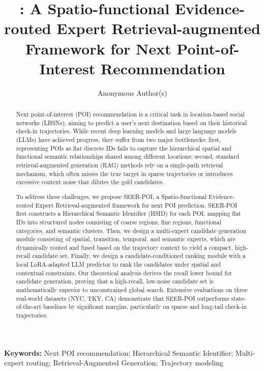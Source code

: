 \documentclass[10pt,twocolumn]{article}
\title{\vspace{-1.0em}\bfseries \method: A Spatio-functional Evidence-routed Expert Retrieval-augmented Framework for Next Point-of-Interest Recommendation}
\author{Anonymous Author(s)}
\date{}
\newcommand{\method}{SEER-POI}
\newcommand{\hsid}{HSID}
\begin{document}
\maketitle
\vspace{-1.35em}

\begin{abstract}
Next point-of-interest (POI) recommendation is a critical task in location-based social networks (LBSNs), aiming to predict a user's next destination based on their historical check-in trajectories. While recent deep learning models and large language models (LLMs) have achieved progress, they suffer from two major bottlenecks: first, representing POIs as flat discrete IDs fails to capture the hierarchical spatial and functional semantic relationships shared among different locations; second, standard retrieval-augmented generation (RAG) methods rely on a single-path retrieval mechanism, which often misses the true target in sparse trajectories or introduces excessive context noise that dilutes the gold candidates. 

To address these challenges, we propose \method, a Spatio-functional Evidence-routed Expert Retrieval-augmented framework for next POI prediction. \method{} first constructs a Hierarchical Semantic Identifier (\hsid) for each POI, mapping flat IDs into structured nodes consisting of coarse regions, fine regions, functional categories, and semantic clusters. Then, we design a multi-expert candidate generation module consisting of spatial, transition, temporal, and semantic experts, which are dynamically routed and fused based on the trajectory context to yield a compact, high-recall candidate set. Finally, we design a candidate-conditioned ranking module with a local LoRA-adapted LLM predictor to rank the candidates under spatial and contextual constraints. Our theoretical analysis derives the recall lower bound for candidate generation, proving that a high-recall, low-noise candidate set is mathematically superior to unconstrained global search. Extensive evaluations on three real-world datasets (NYC, TKY, CA) demonstrate that \method{} outperforms state-of-the-art baselines by significant margins, particularly on sparse and long-tail check-in trajectories.
\end{abstract}

\noindent\textbf{Keywords:} Next POI recommendation; Hierarchical Semantic Identifier; Multi-expert routing; Retrieval-Augmented Generation; Trajectory modeling
\end{document}
